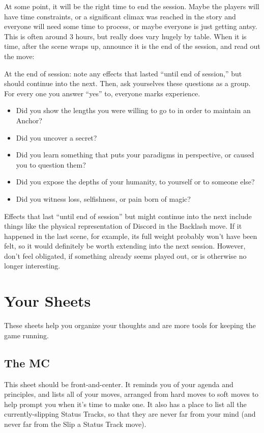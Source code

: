 \documentclass[
  oneside,
  statementpaper,
  9pt]{memoir}
\begin{document}
At some point, it will be the right time to end the session. Maybe the
players will have time constraints, or a significant climax was reached
in the story and everyone will need some time to process, or maybe
everyone is just getting antsy. This is often around 3 hours, but really
does vary hugely by table. When it is time, after the scene wraps up,
announce it is the end of the session, and read out the move:

At the end of session: note any effects that lasted ``until end of
session,'' but should continue into the next. Then, ask yourselves these
questions as a group. For every one you answer ``yes'' to, everyone
marks experience.

\begin{itemize}
\item
  Did you show the lengths you were willing to go to in order to
  maintain an Anchor?
\item
  Did you uncover a secret?
\item
  Did you learn something that puts your paradigms in perspective, or
  caused you to question them?
\item
  Did you expose the depths of your humanity, to yourself or to someone
  else?
\item
  Did you witness loss, selfishness, or pain born of magic?
\end{itemize}

Effects that last ``until end of session'' but might continue into the
next include things like the physical representation of Discord in the
Backlash move. If it happened in the last scene, for example, its full
weight probably won't have been felt, so it would definitely be worth
extending into the next session. However, don't feel obligated, if
something already seems played out, or is otherwise no longer
interesting.

\hypertarget{your-sheets}{%
\section{Your Sheets}\label{your-sheets}}

These sheets help you organize your thoughts and are more tools for
keeping the game running.

\hypertarget{the-mc}{%
\subsection{The MC}\label{the-mc}}

This sheet should be front-and-center. It reminds you of your agenda and
principles, and lists all of your moves, arranged from hard moves to
soft moves to help prompt you when it's time to make one. It also has a
place to list all the currently-slipping Status Tracks, so that they are
never far from your mind (and never far from the Slip a Status Track
move).
\end{document}
